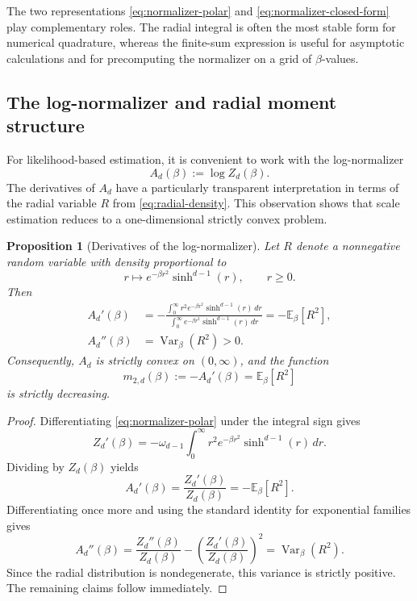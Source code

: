 \documentclass[11pt]{article}
\newtheorem{proposition}[theorem]{Proposition}
\begin{document}
The two representations \eqref{eq:normalizer-polar} and \eqref{eq:normalizer-closed-form} play complementary roles. The radial integral is often the most stable form for numerical quadrature, whereas the finite-sum expression is useful for asymptotic calculations and for precomputing the normalizer on a grid of \(\beta\)-values.

\subsection{The log-normalizer and radial moment structure}\label{subsec:lognormalizer}

For likelihood-based estimation, it is convenient to work with the log-normalizer
\begin{equation}\label{eq:log-normalizer}
A_d(\beta):=\log Z_d(\beta).
\end{equation}
The derivatives of \(A_d\) have a particularly transparent interpretation in terms of the radial variable \(R\) from \eqref{eq:radial-density}. This observation shows that scale estimation reduces to a one-dimensional strictly convex problem.

\begin{proposition}[Derivatives of the log-normalizer]\label{prop:Ad-derivatives}
Let \(R\) denote a nonnegative random variable with density proportional to
\[
r\longmapsto e^{-\beta r^2}\sinh^{d-1}(r),
\qquad r\ge 0.
\]
Then
\begin{align}
A_d'(\beta)
&=
-\frac{\int_0^\infty r^2 e^{-\beta r^2}\sinh^{d-1}(r)\,dr}
{\int_0^\infty e^{-\beta r^2}\sinh^{d-1}(r)\,dr}
=
-\mathbb{E}_\beta[R^2],\label{eq:Adprime}
\\
A_d''(\beta)
&=
\operatorname{Var}_\beta(R^2)>0.\label{eq:Addoubleprime}
\end{align}
Consequently, \(A_d\) is strictly convex on \((0,\infty)\), and the function
\begin{equation}\label{eq:m2d-def}
m_{2,d}(\beta):=-A_d'(\beta)=\mathbb{E}_\beta[R^2]
\end{equation}
is strictly decreasing.
\end{proposition}

\begin{proof}
Differentiating \eqref{eq:normalizer-polar} under the integral sign gives
\[
Z_d'(\beta)
=
-\omega_{d-1}\int_0^\infty r^2 e^{-\beta r^2}\sinh^{d-1}(r)\,dr.
\]
Dividing by \(Z_d(\beta)\) yields
\[
A_d'(\beta)=\frac{Z_d'(\beta)}{Z_d(\beta)}=-\mathbb{E}_\beta[R^2].
\]
Differentiating once more and using the standard identity for exponential families gives
\[
A_d''(\beta)
=
\frac{Z_d''(\beta)}{Z_d(\beta)}
-
\left(\frac{Z_d'(\beta)}{Z_d(\beta)}\right)^2
=
\operatorname{Var}_\beta(R^2).
\]
Since the radial distribution is nondegenerate, this variance is strictly positive. The remaining claims follow immediately.
\end{proof}
\end{document}
